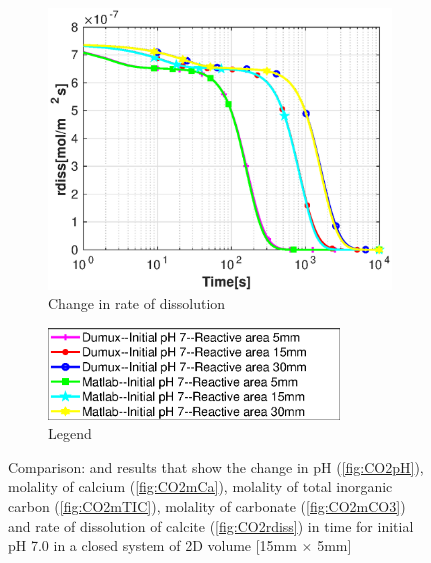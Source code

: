 \begin{figure}
\begin{subfigure}{.5\linewidth}
        \label{fig:dvmpH7mCO3}
    \end{subfigure}%
    \hfill
    \begin{subfigure}{.5\linewidth}
            \centering
        \includegraphics[width=\textwidth]{PICTURES/dvm_pH7_rdiss.eps}
        \caption{Change in rate of dissolution}
        \label{fig:dvmpH7rdiss}
    \end{subfigure}%
   \hfill
   \begin{subfigure}{.5\linewidth}
            \centering
        \includegraphics[width=0.85\textwidth]{PICTURES/dvm_pH7_legend.eps}
        \caption{Legend}
        \label{fig:dvmpH7legend}
    \end{subfigure}%
   \caption{Comparison: \DuMuX and \MATLAB results that show the change in pH (\cref{fig:CO2pH}), 
   molality of calcium (\cref{fig:CO2mCa}), molality of total inorganic carbon (\cref{fig:CO2mTIC}), 
   molality of carbonate (\cref{fig:CO2mCO3}) and rate of dissolution of calcite (\cref{fig:CO2rdiss}) 
   in time for initial pH 7.0 in a closed system of 2D volume [15mm $\times$ 5mm]} 
    \label{fig:comparisionDumuxMatlab_pH7.0}
\end{figure}


